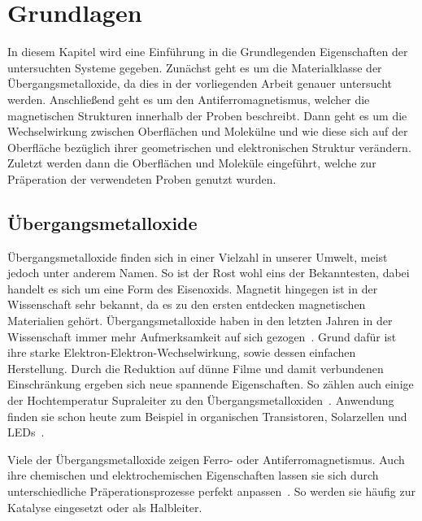 \chapter{Grundlagen}
    In diesem Kapitel wird eine Einführung in die Grundlegenden Eigenschaften der untersuchten Systeme gegeben.
    Zunächst geht es um die Materialklasse der Übergangsmetalloxide, da dies in der vorliegenden Arbeit genauer untersucht werden.
    Anschließend geht es um den Antiferromagnetismus, welcher die magnetischen Strukturen innerhalb der Proben beschreibt.
    Dann geht es um die Wechselwirkung zwischen Oberflächen und Molekülne und wie diese sich auf der Oberfläche bezüglich ihrer geometrischen und elektronischen Struktur verändern.
    Zuletzt werden dann die Oberflächen und Moleküle eingeführt, welche zur Präperation der verwendeten Proben genutzt wurden.

    \section{Übergangsmetalloxide}
        Übergangsmetalloxide finden sich in einer Vielzahl in unserer Umwelt, meist jedoch unter anderem Namen.
        So ist der Rost wohl eins der Bekanntesten, dabei handelt es sich um eine Form des Eisenoxids.
        Magnetit hingegen ist in der Wissenschaft sehr bekannt, da es zu den ersten entdecken magnetischen Materialien gehört.
        Übergangsmetalloxide haben in den letzten Jahren in der Wissenschaft immer mehr Aufmerksamkeit auf sich gezogen~\cite{IF_6}.
        Grund dafür ist ihre starke Elektron-Elektron-Wechselwirkung, sowie dessen einfachen Herstellung.
        Durch die Reduktion auf dünne Filme und damit verbundenen Einschränkung ergeben sich neue spannende Eigenschaften.
        So zählen auch einige der Hochtemperatur Supraleiter zu den Übergangsmetalloxiden~\cite{IF_5}.
        Anwendung finden sie schon heute zum Beispiel in organischen Transistoren, Solarzellen und LEDs~\cite{IF_3}.

        Viele der Übergangsmetalloxide zeigen Ferro- oder Antiferromagnetismus. 
        Auch ihre chemischen und elektrochemischen Eigenschaften lassen sie sich durch unterschiedliche Präperationsprozesse perfekt anpassen~\cite{Uni-Tübingen}.
        So werden sie häufig zur Katalyse eingesetzt oder als Halbleiter.


